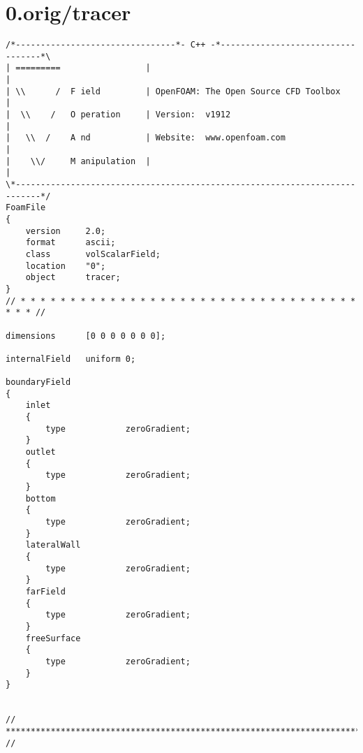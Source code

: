 \section{0.orig/tracer}
\begin{lstlisting}
/*--------------------------------*- C++ -*----------------------------------*\
| =========                 |                                                 |
| \\      /  F ield         | OpenFOAM: The Open Source CFD Toolbox           |
|  \\    /   O peration     | Version:  v1912                                 |
|   \\  /    A nd           | Website:  www.openfoam.com                      |
|    \\/     M anipulation  |                                                 |
\*---------------------------------------------------------------------------*/
FoamFile
{
    version     2.0;
    format      ascii;
    class       volScalarField;
    location    "0";
    object      tracer;
}
// * * * * * * * * * * * * * * * * * * * * * * * * * * * * * * * * * * * * * //

dimensions      [0 0 0 0 0 0 0];

internalField   uniform 0;

boundaryField
{
    inlet           
    {
        type			zeroGradient;
    }
    outlet          
    {
        type			zeroGradient;
    }
    bottom
    {
        type            zeroGradient;
    }
    lateralWall
    {
        type            zeroGradient;
    }
    farField
    {
        type            zeroGradient;
    }
    freeSurface
    {
        type            zeroGradient;
    }
}


// ************************************************************************* //

\end{lstlisting}

